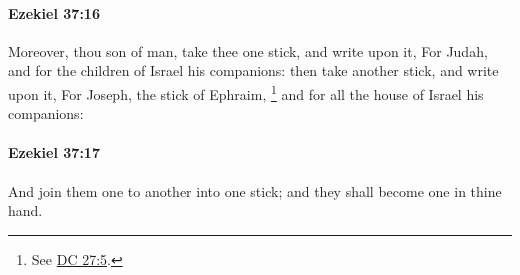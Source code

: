 		\paragraph{Ezekiel 37:16} %
			\label{EZEKIEL-37-16}

			Moreover, thou son of man, take thee one stick, and write upon it, For Judah, and for the children of Israel his companions: then take another stick, and write upon it, For Joseph, the stick of Ephraim,%
				\footnote{%
					See \hyperref[DC27-5]{DC 27:5}.
					}
			and for all the house of Israel his companions:


		\paragraph{Ezekiel 37:17} %
			\label{EZEKIEL-37-17}

			And join them one to another into one stick; and they shall become one in thine hand.

